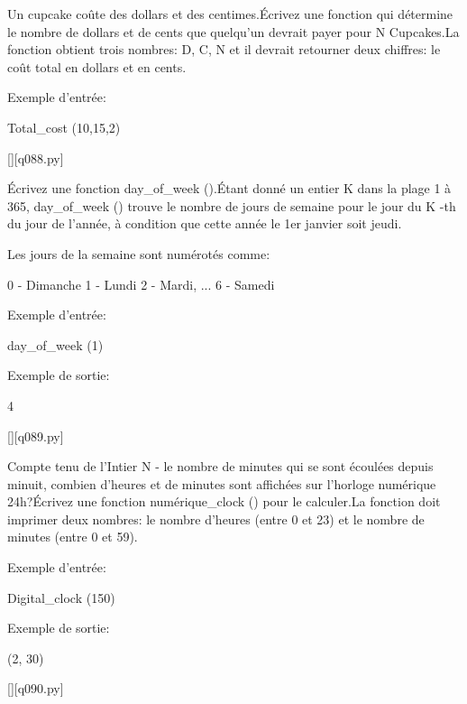         \question
        Un cupcake coûte des dollars et des centimes.Écrivez une fonction qui détermine le nombre de dollars et de cents que quelqu'un devrait payer pour N Cupcakes.La fonction obtient trois nombres: D, C, N et il devrait retourner deux chiffres: le coût total en dollars et en cents.

Exemple d'entrée:

Total\_cost (10,15,2)
        \par
        \renewcommand{\nomfichier}{q088.py}
        \begin{solution}
            \pythonfile{\chemincode \nomfichier}[][\nomfichier]
        \end{solution}
        

        \question
        Écrivez une fonction day\_of\_week ().Étant donné un entier K dans la plage 1 à 365, day\_of\_week () trouve le nombre de jours de semaine pour le jour du K -th du jour de l'année, à condition que cette année le 1er janvier soit jeudi.

Les jours de la semaine sont numérotés comme:

0 - Dimanche
1 - Lundi
2 - Mardi, ...
6 - Samedi

Exemple d'entrée:

day\_of\_week (1)

Exemple de sortie:

4
        \par
        \renewcommand{\nomfichier}{q089.py}
        \begin{solution}
            \pythonfile{\chemincode \nomfichier}[][\nomfichier]
        \end{solution}
        

        \question
        Compte tenu de l'Intier N - le nombre de minutes qui se sont écoulées depuis minuit, combien d'heures et de minutes sont affichées sur l'horloge numérique 24h?Écrivez une fonction numérique\_clock () pour le calculer.La fonction doit imprimer deux nombres: le nombre d'heures (entre 0 et 23) et le nombre de minutes (entre 0 et 59).

Exemple d'entrée:

Digital\_clock (150)

Exemple de sortie:

(2, 30)
        \par
        \renewcommand{\nomfichier}{q090.py}
        \begin{solution}
            \pythonfile{\chemincode \nomfichier}[][\nomfichier]
        \end{solution}
        

